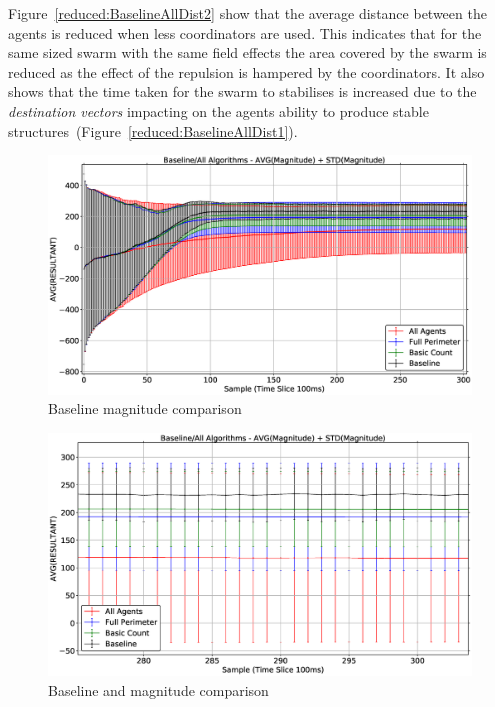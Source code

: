 Figure~\ref{reduced:BaselineAllDist2} show that the average distance between the agents is reduced when less coordinators are used. This indicates that for the same sized swarm with the same field effects the area covered by the swarm is reduced as the effect of the repulsion is hampered by the coordinators. It also shows that the time taken for the swarm to stabilises is increased due to the \textit{destination vectors} impacting on the agents ability to produce stable structures~(Figure~\ref{reduced:BaselineAllDist1}). 

\begin{figure}[H]
\begin{center}
\includegraphics[width=14cm]{CHAPTER-6/figures/BaselineAllMag1}
\end{center}
\caption{Baseline magnitude comparison\label{reduced:BaselineAllMag1}}
\end{figure}

\begin{figure}[H]
\begin{center}
\includegraphics[width=14cm]{CHAPTER-6/figures/BaselineAllMag2}
\end{center}
\caption{Baseline and magnitude comparison\label{reduced:BaselineAllMag2}}
\end{figure}

